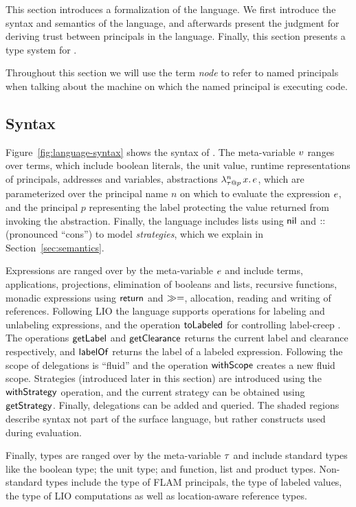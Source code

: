 This section introduces a formalization of the \lang{} language. We first introduce the syntax and semantics of the language, and afterwards present the judgment for deriving trust between principals in the language. Finally, this section presents a type system for \lang. 

Throughout this section we will use the term \emph{node} to refer to named principals when talking about the machine on which the named principal is executing code.

\subsection{Syntax}

Figure~\ref{fig:language-syntax} shows the syntax of \lang. The meta-variable $v$ ranges over terms, which include boolean literals, the unit value, runtime representations of principals, addresses and variables, abstractions $\lambda^{n}_{\tau \mathbin{@} p}\,x.\,e$, which are parameterized over the principal name $n$ on which to evaluate the expression $e$, and the principal $p$ representing the label protecting the value returned from invoking the abstraction. Finally, the language includes lists using $\mathsf{nil}$ and $\mathbin{::}$ (pronounced ``cons'') to model \emph{strategies}, which we explain in Section~\ref{sec:semantics}.

Expressions are ranged over by the meta-variable $e$ and include terms, applications, projections, elimination of booleans and lists, recursive functions, monadic expressions using $\mathsf{return}$ and $\gg=$, allocation, reading and writing of references. Following LIO \cite{SRMMlio} the language supports operations for labeling and unlabeling expressions, and the operation $\mathsf{toLabeled}$ for controlling label-creep \cite{SRMMlio}. The operations $\mathsf{getLabel}$ and $\mathsf{getClearance}$ returns the current label and clearance respectively, and $\mathsf{labelOf}$ returns the label of a labeled expression. Following \cite{Moore:2016:EAC:2983990.2984021} the scope of delegations is ``fluid'' and the operation $\mathsf{withScope}$ creates a new fluid scope. Strategies (introduced later in this section) are introduced using the $\mathsf{withStrategy}$ operation, and the current strategy can be obtained using $\mathsf{getStrategy}$. Finally, delegations can be added and queried. The shaded regions describe syntax not part of the surface language, but rather constructs used during evaluation.

Finally, types are ranged over by the meta-variable $\tau$ and include standard types like the boolean type; the unit type; and function, list and product types. Non-standard types include the type of FLAM principals, the type of labeled values, the type of LIO computations as well as location-aware reference types.


